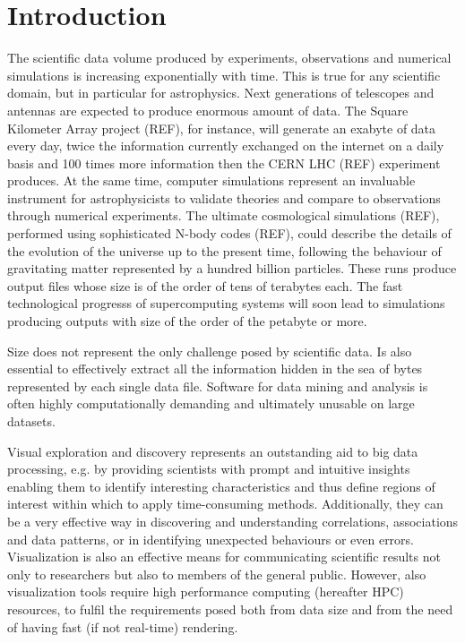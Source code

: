 \documentclass[runningheads,a4paper]{llncs}
\begin{document}
\section{Introduction}
\label{sect:introduction}

The scientific data volume produced by experiments, observations and numerical simulations 
is increasing exponentially with time. This is true for any scientific domain, but in 
particular for astrophysics. Next generations of telescopes and antennas are expected to produce
enormous amount of data. The Square Kilometer Array project (REF), for instance, will 
generate an exabyte of data every day, twice the information currently exchanged on 
the internet on a daily basis and 100 times more information then the CERN LHC (REF) experiment
produces. At the same time, computer simulations represent an invaluable instrument for 
astrophysicists to validate theories and compare to observations through numerical experiments.
The ultimate cosmological simulations (REF), performed using sophisticated N-body codes (REF), 
could describe the details of the evolution of the universe up to the present time, following the behaviour of 
gravitating matter represented by a hundred billion particles. These runs produce output files 
whose size is of the order of tens of terabytes each. The fast technological progresss 
of supercomputing systems will soon lead to simulations producing outputs with size of the order of 
the petabyte or more. 

Size does not represent the only challenge posed by scientific data. Is also essential to 
effectively extract all the information hidden in the sea of bytes represented by each 
single data file. Software for data mining and analysis is often highly computationally
demanding and ultimately unusable on large datasets.  

Visual exploration and discovery represents an outstanding aid to big data processing, 
e.g. by providing scientists with
prompt and intuitive insights enabling them to identify interesting 
characteristics and thus define regions of interest within which to apply time-consuming 
methods. Additionally, they can be a very effective way in discovering and
understanding correlations, associations and data patterns, or in identifying unexpected behaviours
or even errors. Visualization is also an effective means for communicating scientific results not
only to researchers but also to members of the general public.
However, also visualization tools require high performance computing (hereafter HPC) resources, to 
fulfil the requirements posed both from data size and from the need of having
fast (if not real-time) rendering.
\end{document}
